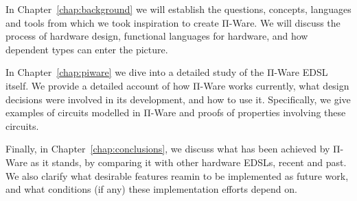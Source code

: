     In Chapter~\ref{chap:background} we will establish the questions, concepts, languages and tools
    from which we took inspiration to create Π-Ware.
    We will discuss the process of hardware design, functional languages for hardware,
    and how dependent types can enter the picture.

    In Chapter~\ref{chap:piware} we dive into a detailed study of the Π-Ware \ac{EDSL} itself.
    We provide a detailed account of how Π-Ware works currently,
    what design decisions were involved in its development, and how to use it.
    Specifically, we give examples of circuits modelled in Π-Ware and proofs of properties involving
    these circuits.

    Finally, in Chapter~\ref{chap:conclusions}, we discuss what has been achieved by Π-Ware as it stands,
    by comparing it with other hardware \acp{EDSL}, recent and past.
    We also clarify what desirable features reamin to be implemented as future work,
    and what conditions (if any) these implementation efforts depend on.

